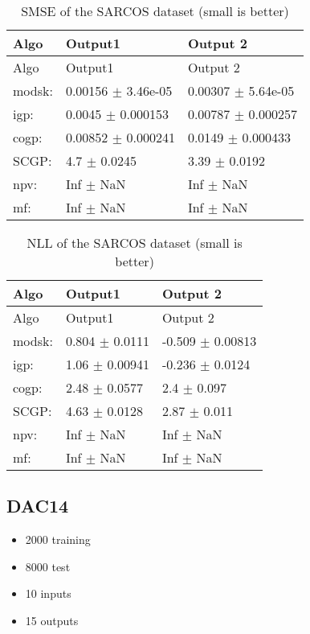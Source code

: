 \begin{longtable}[]{@{}lll@{}}
\caption{SMSE of the SARCOS dataset (small is better)}\tabularnewline
\toprule
Algo & Output1 & Output 2\tabularnewline
\midrule
\endfirsthead
\toprule
Algo & Output1 & Output 2\tabularnewline
\midrule
\endhead
modsk: & 0.00156 \(\pm\) 3.46e-05 & 0.00307 \(\pm\)
5.64e-05\tabularnewline
igp: & 0.0045 \(\pm\) 0.000153 & 0.00787 \(\pm\) 0.000257\tabularnewline
cogp: & 0.00852 \(\pm\) 0.000241 & 0.0149 \(\pm\)
0.000433\tabularnewline
SCGP: & 4.7 \(\pm\) 0.0245 & 3.39 \(\pm\) 0.0192\tabularnewline
npv: & Inf \(\pm\) NaN & Inf \(\pm\) NaN\tabularnewline
mf: & Inf \(\pm\) NaN & Inf \(\pm\) NaN\tabularnewline
\bottomrule
\end{longtable}

\begin{longtable}[]{@{}lll@{}}
\caption{NLL of the SARCOS dataset (small is better)}\tabularnewline
\toprule
Algo & Output1 & Output 2\tabularnewline
\midrule
\endfirsthead
\toprule
Algo & Output1 & Output 2\tabularnewline
\midrule
\endhead
modsk: & 0.804 \(\pm\) 0.0111 & -0.509 \(\pm\) 0.00813\tabularnewline
igp: & 1.06 \(\pm\) 0.00941 & -0.236 \(\pm\) 0.0124\tabularnewline
cogp: & 2.48 \(\pm\) 0.0577 & 2.4 \(\pm\) 0.097\tabularnewline
SCGP: & 4.63 \(\pm\) 0.0128 & 2.87 \(\pm\) 0.011\tabularnewline
npv: & Inf \(\pm\) NaN & Inf \(\pm\) NaN\tabularnewline
mf: & Inf \(\pm\) NaN & Inf \(\pm\) NaN\tabularnewline
\bottomrule
\end{longtable}

\subsection{DAC14}\label{sec:dac14}

\begin{itemize}
\item
  2000 training
\item
  8000 test
\item
  10 inputs
\item
  15 outputs
\end{itemize}

